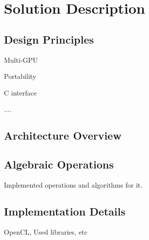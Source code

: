 \section{Solution Description}

\subsection{Design Principles}

Multi-GPU

Portability

C interface

....


\subsection{Architecture Overview}

\subsection{Algebraic Operations}

Implemented operations and algorithms for it.

\subsection{Implementation Details}

OpenCL, Used libraries,  etc